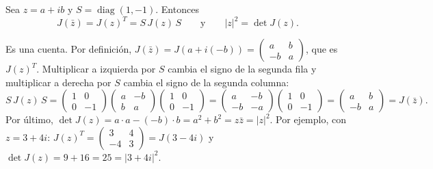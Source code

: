 \begin{proposicion}\label{prop:conjugado-complejo}
Sea \(z=a+ib\) y \(S=\operatorname{diag}(1,-1)\). Entonces
\[
  J(\bar z)=J(z)^T=S\,J(z)\,S
  \qquad\text{y}\qquad
  \lvert z\rvert^2=\det J(z).
\]
\end{proposicion}

\begin{demostracion}
Es una cuenta. Por definición, \(J(\bar z)=J(a+i(-b))=\left(\begin{smallmatrix}a&b\\-b&a\end{smallmatrix}\right)\),
que es \(J(z)^T\). Multiplicar a izquierda por \(S\) cambia el signo de la segunda fila y
multiplicar a derecha por \(S\) cambia el signo de la segunda columna:
\[
  S\,J(z)\,S=\begin{pmatrix}1&0\\0&-1\end{pmatrix}\begin{pmatrix}a&-b\\b&a\end{pmatrix}
  \begin{pmatrix}1&0\\0&-1\end{pmatrix}
  =\begin{pmatrix}a&-b\\-b&-a\end{pmatrix}\begin{pmatrix}1&0\\0&-1\end{pmatrix}
  =\begin{pmatrix}a&b\\-b&a\end{pmatrix}=J(\bar z).
\]
Por último, \(\det J(z)=a\cdot a-(-b)\cdot b=a^2+b^2=z\bar z=\lvert z\rvert^2\). Por ejemplo,
con \(z=3+4i\): \(J(z)^T=\left(\begin{smallmatrix}3&4\\-4&3\end{smallmatrix}\right)=J(3-4i)\)
y \(\det J(z)=9+16=25=\lvert3+4i\rvert^2\).
\end{demostracion}

